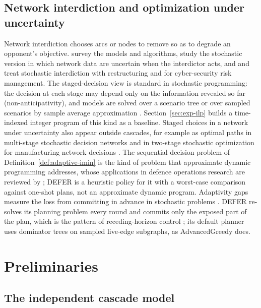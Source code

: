 \documentclass[preprint,11pt]{elsarticle}
\theoremstyle{definition}
\theoremstyle{remark}
\begin{document}
\subsection{Network interdiction and optimization under uncertainty}

Network interdiction chooses arcs or nodes to remove so as to degrade an opponent's objective. \citet{smith2020} survey the models and algorithms, \citet{cormican1998} study the stochastic version in which network data are uncertain when the interdictor acts, and \citet{janan2025} and \citet{bhuiyan2021} treat stochastic interdiction with restructuring and for cyber-security risk management. The staged-decision view is standard in stochastic programming: the decision at each stage may depend only on the information revealed so far (non-anticipativity), and models are solved over a scenario tree \citep{birge2011} or over sampled scenarios by sample average approximation \citep{kleywegt2002}. Section~\ref{sec:exp-ilp} builds a time-indexed integer program of this kind as a baseline. Staged choices in a network under uncertainty also appear outside cascades, for example as optimal paths in multi-stage stochastic decision networks \citep{roohnavazfar2019} and in two-stage stochastic optimization for manufacturing network decisions \citep{gomezrocha2026}. The sequential decision problem of Definition~\ref{def:adaptive-imin} is the kind of problem that approximate dynamic programming addresses, whose applications in defence operations research are reviewed by \citet{rempel2021}; DEFER is a heuristic policy for it with a worst-case comparison against one-shot plans, not an approximate dynamic program. Adaptivity gaps measure the loss from committing in advance in stochastic problems \citep{deangoemansvondrak2008,gupta2016}. DEFER re-solves its planning problem every round and commits only the exposed part of the plan, which is the pattern of receding-horizon control \citep{mayne2000}; its default planner uses dominator trees \citep{lengauer1979} on sampled live-edge subgraphs, as AdvancedGreedy does.

\section{Preliminaries}\label{sec:prelim}
\subsection{The independent cascade model}\label{sec:ic-model}
\end{document}
